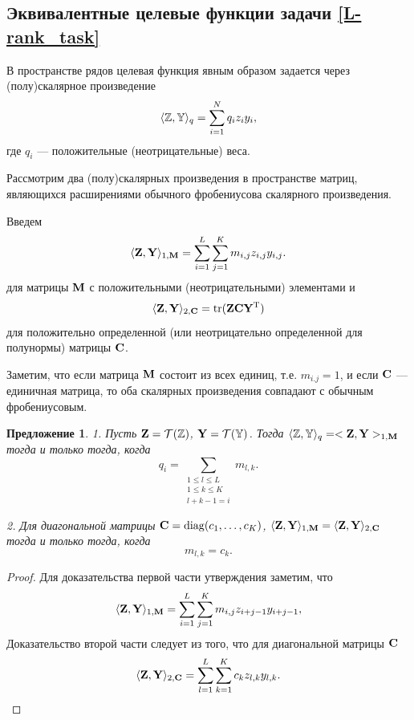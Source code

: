 \documentclass[12pt,a4paper,fleqn,leqno]{article}
\DeclareMathOperator{\tr}{tr}
\newtheorem{proposition}{Предложение}%
\begin{document}
\subsection{Эквивалентные целевые функции задачи \eqref{L-rank_task}}
В пространстве рядов целевая функция явным образом задается через (полу)скалярное произведение
\begin{equation}
\label{eq:norm_ser}
    \langle\mathbb{Z},\mathbb{Y}\rangle_q = \sum_{i = 1}^N q_i z_i y_i,
\end{equation}
где $q_i$ --- положительные (неотрицательные) веса.

Рассмотрим два (полу)скалярных произведения в пространстве матриц, являющихся расширениями
обычного фробениусова скалярного произведения.

Введем
\begin{equation}
\label{eq:norm1M}
    \langle\mathbf{Z},\mathbf{Y}\rangle_{1,\mathbf{M}} = \sum_{i = 1}^L \sum_{j=1}^K m_{i,j} z_{i,j} y_{i,j}.
\end{equation}
для матрицы $\mathbf{M}$ с положительными (неотрицательными) элементами и
\begin{equation}
\label{eq:norm2S}
    \langle\bfZ,\bfY\rangle_{2,\bfC} = \tr(\bfZ \bfC \bfY^\rmT)
\end{equation}
для положительно определенной (или неотрицательно определенной для полунормы) матрицы $\mathbf{C}$.

Заметим, что если матрица $\mathbf{M}$ состоит из всех единиц, т.е. $m_{i.j}=1$,
и если $\mathbf{C}$ --- единичная матрица, то оба скалярных произведения совпадают
с обычным фробениусовым.

\begin{proposition}
\label{prop:equiv_tasks}
1. Пусть $\mathbf{Z} = \mathcal{T}(\mathbb{Z})$,  $\mathbf{Y} = \mathcal{T}(\mathbb{Y})$. Тогда $\langle\mathbb{Z},\mathbb{Y}\rangle_q= <\mathbf{Z},\mathbf{Y}>_{1,\mathbf{M}}$ тогда и только тогда, когда
\begin{equation}\label{qi_mi}
q_i = \sum_{\substack{1 \le l \le L \\ 1 \le k \le K \\ l+k-1=i}} m_{l,k}.
\end{equation}

2. Для диагональной матрицы $\mathbf{C}=\mathop{\mathrm{diag}}(c_1,\ldots,c_K)$, $\langle\mathbf{Z},\mathbf{Y}\rangle_{1,\mathbf{M}}= \langle\mathbf{Z},\mathbf{Y}\rangle_{2,\mathbf{C}}$ тогда и только тогда, когда
\begin{equation}\label{sk_mlk}
m_{l,k}=c_k.
\end{equation}
\end{proposition}
\begin{proof}
Для доказательства первой части утверждения заметим, что
\begin{equation*}
\langle \mathbf{Z}, \mathbf{Y} \rangle_{1,\mathbf{M}} = \sum_{i = 1}^L \sum_{j = 1}^K m_{i,j} z_{i + j - 1} y_{i + j - 1},
\end{equation*}
Доказательство второй части следует из того, что для диагональной матрицы $\mathbf{C}$
\begin{equation*}
\langle \mathbf{Z}, \mathbf{Y} \rangle_{2,\mathbf{C}} = \sum_{l=1}^L \sum_{k=1}^K c_k z_{l,k} y_{l, k}.
\end{equation*}
\end{proof}
\end{document}
